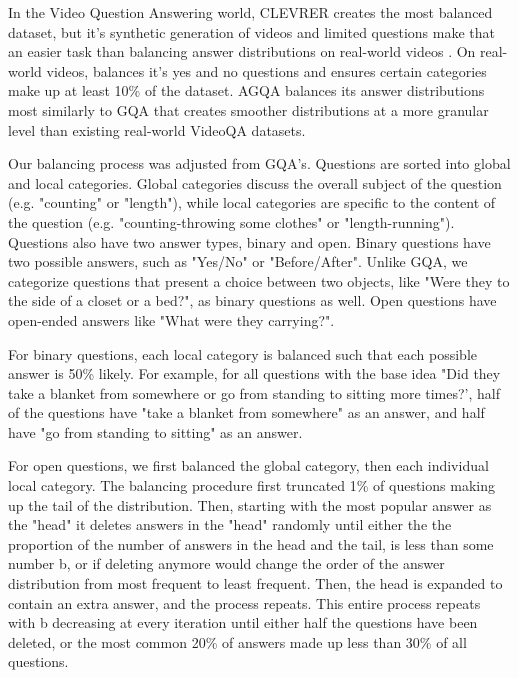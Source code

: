 \documentclass[10pt,twocolumn,letterpaper]{article}
\newcommand{\mgm}[1]{{\color{cyan}{mgm: #1}}}
\begin{document}
In the Video Question Answering world, CLEVRER creates the most balanced dataset, but it's synthetic generation of videos and limited questions make that an easier task than balancing answer distributions on real-world videos \cite{yi2019clevrer}. On real-world videos, \cite{yu2019activitynet} balances it's yes and no questions and ensures certain categories make up at least 10\% of the dataset. AGQA balances its answer distributions most similarly to GQA that creates smoother distributions at a more granular level than existing real-world VideoQA datasets. 

Our balancing process was adjusted from GQA's. Questions are sorted into global and local categories. Global categories discuss the overall subject of the question (e.g. "counting" or "length"), while local categories are specific to the content of the question (e.g. "counting-throwing some clothes" or "length-running"). Questions also have two answer types, binary and open. Binary questions have two possible answers, such as "Yes/No" or "Before/After". Unlike GQA, we categorize questions that present a choice between two objects, like "Were they to the side of a closet or a bed?", as binary questions as well. Open questions have open-ended answers like "What were they carrying?". 

For binary questions, each local category is balanced such that each possible answer is 50\% likely. For example, for all questions with the base idea "Did they take a blanket from somewhere or go from standing to sitting more times?', half of the questions have "take a blanket from somewhere" as an answer, and half have "go from standing to sitting" as an answer. 

For open questions, we first balanced the global category, then each individual local category. The balancing procedure first truncated 1\% of questions making up the tail of the distribution. \mgm{may want to have a separate algorithm aside to describe this idk. It's a bit of a mouthful} Then, starting with the most popular answer as the "head" it deletes answers in the "head" randomly until either the the proportion of the number of answers in the head and the tail, is less than some number b, or if deleting anymore would change the order of the answer distribution from most frequent to least frequent. Then, the head is expanded to contain an extra answer, and the process repeats. This entire process repeats with b decreasing at every iteration until either half the questions have been deleted, or the most common 20\% of answers made up less than 30\% of all questions. \mgm{Do we need to explain where got the numbers from? It was mostly just experimenting} \mgm{Will be turning this into a figure. }
\end{document}
